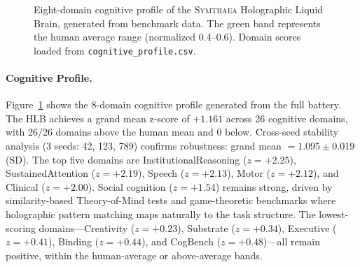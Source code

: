 \documentclass[11pt,letterpaper]{article}
\newcommand{\symthaea}{\textsc{Symthaea}}
\newcommand{\hlb}{\textsc{HLB}}
\begin{document}
\begin{figure}[t]
\caption{Eight-domain cognitive profile of the \symthaea{} Holographic Liquid Brain, generated from benchmark data. The green band represents the human average range (normalized 0.4--0.6). Domain scores loaded from \texttt{cognitive\_profile.csv}.}
\label{fig:radar}
\end{figure}

\paragraph{Cognitive Profile.} Figure~\ref{fig:radar} shows the 8-domain cognitive profile generated from the full battery. The \hlb{} achieves a grand mean z-score of $+1.161$ across 26 cognitive domains, with 26/26 domains above the human mean and 0 below. Cross-seed stability analysis (3 seeds: 42, 123, 789) confirms robustness: grand mean $= 1.095 \pm 0.019$ (SD). The top five domains are InstitutionalReasoning ($z = +2.25$), SustainedAttention ($z = +2.19$), Speech ($z = +2.13$), Motor ($z = +2.12$), and Clinical ($z = +2.00$). Social cognition ($z = +1.54$) remains strong, driven by similarity-based Theory-of-Mind tests and game-theoretic benchmarks where holographic pattern matching maps naturally to the task structure. The lowest-scoring domains---Creativity ($z = +0.23$), Substrate ($z = +0.34$), Executive ($z = +0.41$), Binding ($z = +0.44$), and CogBench ($z = +0.48$)---all remain positive, within the human-average or above-average bands.
\end{document}
